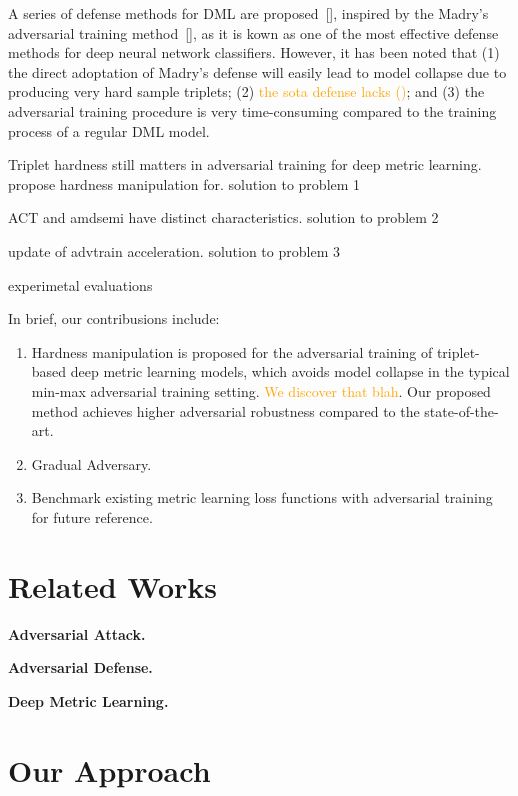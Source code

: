 \documentclass[10pt,twocolumn,letterpaper]{article}
\newcommand{\oo}[1]{\textcolor{orange}{#1}}
\begin{document}
A series of defense methods for DML are proposed~[], inspired by the Madry's
adversarial training method~[], as it is kown as one of the most effective
defense methods for deep neural network classifiers.
%
However, it has been noted that
%
(1) the direct adoptation of Madry's defense will easily lead to model collapse
due to producing very hard sample triplets;
%
(2) \oo{the sota defense lacks ()};
%
and (3) the adversarial training procedure is very time-consuming compared
to the training process of a regular DML model.

Triplet hardness still matters in adversarial training for deep metric
learning.
%
propose hardness manipulation for.
solution to problem 1

ACT and amdsemi have distinct characteristics.
solution to problem 2

update of advtrain acceleration.
solution to problem 3

experimetal evaluations

In brief, our contribusions include:
%
\begin{enumerate}
	\item Hardness manipulation is proposed for the adversarial training
		of triplet-based deep metric learning models, which avoids model
		collapse in the typical min-max adversarial training setting.
		\oo{We discover that blah}.
		Our proposed method achieves higher adversarial robustness compared
		to the state-of-the-art.
	\item Gradual Adversary.
	\item Benchmark existing metric learning loss functions with adversarial
		training for future reference.
\end{enumerate}

\section{Related Works}
\label{sec:2}

\textbf{Adversarial Attack.}

\textbf{Adversarial Defense.}

\textbf{Deep Metric Learning.}
\cite{advrank,advorder,robrank}

\section{Our Approach}
\label{sec:3}
\end{document}
